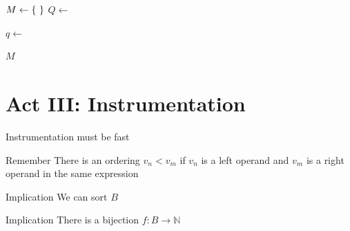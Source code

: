 \documentclass[xcolor = {dvipsnames, table}, aspectratio=169]{beamer}
\begin{document}
\begin{frame}
      \begin{algorithmic}[1]
          \State $M \gets \set{}$
                  \State $Q \gets$ 
                  \State {}

                  \Repeat
                      \State $q \gets$ 
                      \State {}
                      \State {}

                          \State {}
                      \EndFor

              \EndFor
          \EndFor
          \State \Return $M$
      \EndFunction
  \end{algorithmic}
\end{frame}

\section{Act III: Instrumentation}

\begin{frame}
    Instrumentation must be fast
\end{frame}

\begin{frame}
    \begin{block}{Remember}
        There is an ordering $v_n < v_m$ if $v_n$ is a left operand and $v_m$ is
        a right operand in the same expression
    \end{block}

    \begin{block}{Implication}
        We can sort $B$
    \end{block}

    \begin{block}{Implication}
        There is a bijection $f: B \rightarrow \mathbb{N}$
    \end{block}
\end{frame}
\end{document}
